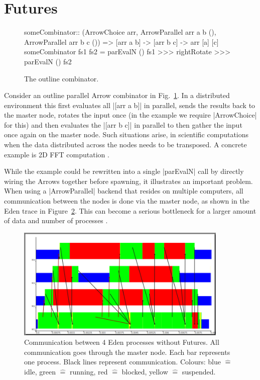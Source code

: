 \section{Futures} \label{sec:futures}\label{futures}
\begin{figure}[t]
\begin{code}
someCombinator:: (ArrowChoice arr,
	ArrowParallel arr a b (),
	ArrowParallel arr b c ()) =>
	[arr a b] -> [arr b c] -> arr [a] [c]
someCombinator fs1 fs2 =
	parEvalN () fs1 >>>
	rightRotate >>>
	parEvalN () fs2
\end{code}
\caption{The outline combinator.}
\label{fig:someCombinator}
\end{figure}

Consider an outline parallel Arrow combinator in Fig.~\ref{fig:someCombinator}. In a distributed environment this first evaluates all |[arr a b]| in parallel, sends the results back to the master node, rotates the input once (in the example we require |ArrowChoice| for this) and then evaluates the |[arr b c]| in parallel to then gather the input once again on the master node.
Such situations arise, \eg in scientific computations when the data distributed across the nodes needs to be transposed. A concrete example is 2D FFT computation \cite{Gorlatch,Berthold2009-fft}.

While the example could be rewritten into a single |parEvalN| call by directly wiring the Arrows together before spawning, it illustrates an important problem. When using a |ArrowParallel| backend that resides on multiple computers, all communication between the nodes is done via the master node, as shown in the Eden trace in Figure~\ref{fig:withoutFutures}. This can become a serious bottleneck
for a larger amount of data and number of processes \citep[as e.g.][showcases]{Berthold2009-fft}.
\begin{figure}[ht]
	\centering
	\includegraphics[width=0.9\textwidth]{images/withoutFutures}
	\caption[without Futures]{Communication between 4 Eden processes without Futures. All communication goes through the master node. Each bar represents one process. Black lines represent communication. Colours: blue $\hat{=}$ idle, green $\hat{=}$ running, red  $\hat{=}$ blocked, yellow $\hat{=}$ suspended.}
	\label{fig:withoutFutures}
\end{figure}

